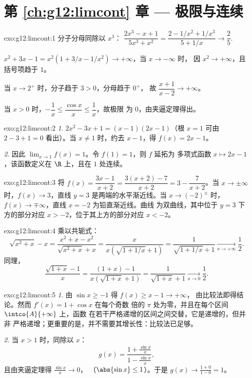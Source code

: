 \section*{第 \ref{ch:g12:limcont} 章 --- 极限与连续}

\begin{solution}{exo:g12:limcont:1}
分子分母同除以 $x^3$：
$\dfrac{2x^3 - x + 1}{5x^3 + x^2} = \dfrac{2 - 1/x^2 + 1/x^3}{5 + 1/x}
\to \dfrac{2}{5}$.

$x^2 + 3x - 1 = x^2(1 + 3/x - 1/x^2) \to +\infty$，当 $x \to -\infty$ 时，
因 $x^2 \to +\infty$，且括号项趋于 $1$。

当 $x \to 2^+$ 时，分子趋于 $3 > 0$，分母趋于 $0^+$，
故 $\dfrac{x+1}{x-2} \to +\infty$。

当 $x > 0$ 时，$-\dfrac1x \leq \dfrac{\cos x}{x} \leq \dfrac1x$，故极限
为 $0$，由夹逼定理得出。
\end{solution}

\begin{solution}{exo:g12:limcont:2}
\emph{1.} $2x^2 - 3x + 1 = (x-1)(2x-1)$（根 $x=1$ 可由
$2 - 3 + 1 = 0$ 看出）。当 $x \neq 1$ 时，约去 $x - 1$，得 $f(x) = 2x - 1$。

\emph{2.} 因此 $\lim_{x\to1} f(x) = 1$。令 $f(1) = 1$，则 $f$ 延拓为
多项式函数 $x \mapsto 2x-1$，该函数定义在 $\R$ 上，且在 $1$ 处连续。
\end{solution}

\begin{solution}{exo:g12:limcont:3}
将 $f(x) = \dfrac{3x - 1}{x + 2} = \dfrac{3(x+2) - 7}{x+2}
= 3 - \dfrac{7}{x+2}$。当 $x \to \pm\infty$ 时，$f(x) \to 3$，直线 $y = 3$
是两端的水平渐近线。当 $x \to (-2)^\pm$ 时，
$f(x) \to \mp\infty$，直线 $x = -2$ 为铅直渐近线。曲线
为双曲线，其中位于 $y=3$ 下方的部分对应 $x > -2$，位于其上方的部分对应 $x < -2$。
\end{solution}

\begin{solution}{exo:g12:limcont:4}
乘以共轭式：
\[
\sqrt{x^2 + x} - x = \frac{x^2 + x - x^2}{\sqrt{x^2+x} + x}
= \frac{x}{x\left(\sqrt{1 + 1/x} + 1\right)}
= \frac{1}{\sqrt{1 + 1/x} + 1}
\xrightarrow[x\to+\infty]{} \frac{1}{2}.
\]
同理，
\[
\frac{\sqrt{1+x} - 1}{x} = \frac{(1+x) - 1}{x\left(\sqrt{1+x} + 1\right)}
= \frac{1}{\sqrt{1+x} + 1} \xrightarrow[x\to0]{} \frac{1}{2}.
\]
\end{solution}

\begin{solution}{exo:g12:limcont:5}
\emph{1.} 由 $\sin x \geq -1$ 得 $f(x) \geq x - 1 \to +\infty$，
由比较法即得结论。然而 $f'(x) = 1 + \cos x$ 在每个奇数
倍的 $\pi$ 处为零，并且在每个区间 $\intco{A}{+\infty}$ 上，函数
在若干严格递增的区间之间交替，它是递增的，但并非
严格递增；更重要的是，并不需要其增长性：比较法已足够。

\emph{2.} 当 $x > 1$ 时，同除以 $x$：
\[
g(x) = \frac{1 + \frac{\sin x}{x}}{1 - \frac{\sin x}{x}},
\]
且由夹逼定理得 $\frac{\sin x}{x} \to 0$，
（$\abs{\sin x} \leq 1$）。于是 $g(x) \to \frac{1+0}{1-0} = 1$。
\end{solution}


